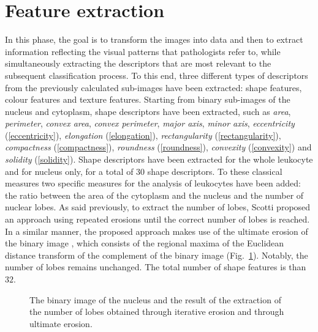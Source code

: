 \documentclass[final,a4paper,12pt,english]{UnicaPhdThesis3}
\begin{document}
\section{Feature extraction}
In this phase, the goal is to transform the images into data and then to extract information reflecting the visual patterns that pathologists refer to, while simultaneously extracting  the descriptors  that  are most relevant to the subsequent classification process. To this end, three different types of descriptors from the previously calculated sub-images have been extracted:  shape features, colour features and texture  features. Starting  from binary sub-images of the nucleus and cytoplasm, shape descriptors have been extracted, such as \textit{area}, \textit{perimeter}, \textit{convex area}, \textit{convex perimeter}, \textit{major axis}, \textit{minor axis}, \textit{eccentricity} (\ref{eccentricity}), \textit{elongation} (\ref{elongation}), \textit{rectangularity} (\ref{rectangularity}), \textit{compactness} (\ref{compactness}), \textit{roundness} (\ref{roundness}), \textit{convexity} (\ref{convexity}) and \textit{solidity} (\ref{solidity}). Shape descriptors have been extracted for the whole leukocyte and for nucleus only, for a total of $30$ shape descriptors. To these classical measures two specific measures for the analysis of leukocytes have been added: the ratio between the area of the cytoplasm and the nucleus and the number of nuclear lobes. As said previously, to extract the number of lobes, Scotti \cite{Sco06} proposed an approach using repeated erosions until  the correct number of lobes is reached. In a similar manner, the proposed approach makes use of the ultimate erosion of the binary image \cite{Serra,Serra2}, which consists of the regional maxima of the Euclidean distance transform of the complement of the binary image (Fig.~\ref{fig:examplelobes}). Notably, the number of lobes remains unchanged. The total number of shape features is than $32$.

\begin{figure}[!tbp]
\centering
\caption{\label{fig:examplelobes}The binary image of the nucleus and the result of the extraction of the number of lobes obtained through iterative erosion and through ultimate erosion. }
\end{figure}
\end{document}
